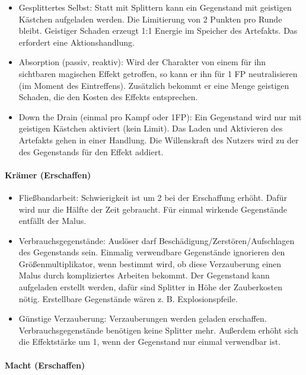 \documentclass{article}
\begin{document}
\begin{itemize}
\item Gesplittertes Selbst: Statt mit Splittern kann ein Gegenstand mit geistigen Kästchen aufgeladen werden. Die Limitierung von 2 Punkten pro Runde bleibt. Geistiger Schaden erzeugt 1:1 Energie im Speicher des Artefakts. Das erfordert eine Aktionshandlung.
\item Absorption (passiv, reaktiv): Wird der Charakter von einem für ihn sichtbaren magischen Effekt getroffen, so kann er ihn für 1 FP neutralisieren (im Moment des Eintreffens). Zusätzlich bekommt er eine Menge geistigen Schaden, die den Kosten des Effekts entsprechen.
\item Down the Drain (einmal pro Kampf oder 1FP): Ein Gegenstand wird nur mit geistigen Kästchen aktiviert (kein Limit). Das Laden und Aktivieren des Artefakts gehen in einer Handlung. Die Willenskraft des Nutzers wird zu der des Gegenstands für den Effekt addiert.
\end{itemize}

\paragraph{Krämer (Erschaffen)}

\begin{itemize}
\item Fließbandarbeit: Schwierigkeit ist um 2 bei der Erschaffung erhöht. Dafür wird nur die Hälfte der Zeit gebraucht. Für einmal wirkende Gegenstände entfällt der Malus.
\item Verbrauchsgegenstände: Auslöser darf Beschädigung/Zerstören/Aufschlagen des Gegenstands sein. Einmalig verwendbare Gegenstände ignorieren den Größenmultiplikator, wenn bestimmt wird, ob diese Verzauberung einen Malus durch kompliziertes Arbeiten bekommt. Der Gegenstand kann aufgeladen erstellt werden, dafür sind Splitter in Höhe der Zauberkosten nötig. Erstellbare Gegenstände wären z. B. Explosionspfeile.
\item Günstige Verzauberung: Verzauberungen werden geladen erschaffen. Verbrauchsgegenstände benötigen keine Splitter mehr. Außerdem erhöht sich die Effektstärke um 1, wenn der Gegenstand nur einmal verwendbar ist.
\end{itemize}

\paragraph{Macht (Erschaffen)}
\end{document}
